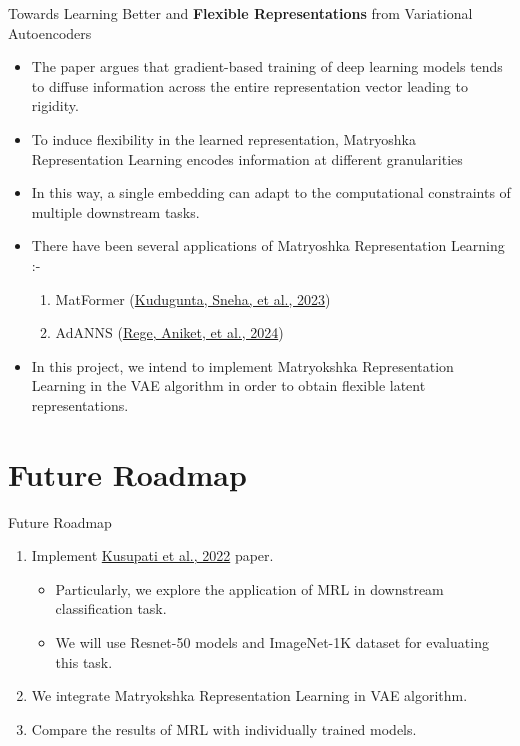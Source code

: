 \documentclass[hyperref={colorlinks,citecolor=blue,linkcolor=blue,urlcolor=blue}]{beamer}
\begin{document}
\begin{frame}{ Towards Learning Better and \textbf{Flexible Representations} from Variational Autoencoders \vspace{0.3em}}
  \begin{itemize}
    \item The paper argues that gradient-based training of deep learning models tends to diffuse information across the entire representation vector leading to rigidity.
    \item To induce flexibility in the learned representation, Matryoshka Representation Learning encodes information at different granularities 
    \item In this way, a single embedding can adapt to the computational constraints of multiple downstream tasks.
    \item There have been several applications of Matryoshka Representation Learning :-
    \begin{enumerate}
      \item MatFormer (\href{https://arxiv.org/pdf/2310.07707.pdf}{Kudugunta, Sneha, et al., 2023})
      \item AdANNS (\href{https://proceedings.neurips.cc/paper_files/paper/2023/file/f062da1973ac9ac61fc6d44dd7fa309f-Paper-Conference.pdf}{Rege, Aniket, et al., 2024})
    \end{enumerate}
    \item In this project, we intend to implement Matryokshka Representation Learning in the VAE algorithm in order to obtain flexible latent representations.
  \end{itemize}
\end{frame}

\section{Future Roadmap}

\begin{frame}{Future Roadmap}
  \begin{enumerate}
    \item Implement \href{https://proceedings.neurips.cc/paper_files/paper/2022/file/c32319f4868da7613d78af9993100e42-Paper-Conference.pdf}{Kusupati et al., 2022} paper.
    \begin{itemize}
      \item Particularly, we explore the application of MRL in downstream classification task.
      \item We will use Resnet-50 models and ImageNet-1K dataset for evaluating this task.
    \end{itemize} 
    \item We integrate Matryokshka Representation Learning in VAE algorithm.
    \item Compare the results of MRL with individually trained models.
  \end{enumerate}
\end{frame}
\end{document}
